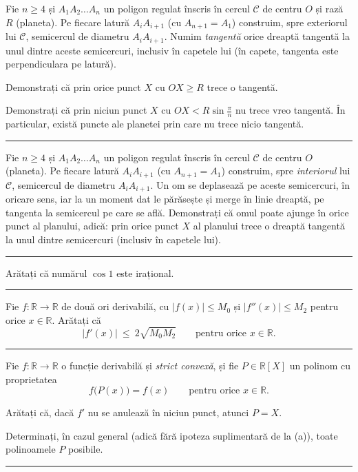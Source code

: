 Fie $n\ge4$ și $A_1A_2\ldots A_n$ un poligon regulat înscris în cercul $\mathcal C$ de centru $O$ și rază $R$ (planeta). Pe fiecare latură $A_iA_{i+1}$ (cu $A_{n+1}=A_1$) construim, spre exteriorul lui $\mathcal C$, semicercul de diametru $A_iA_{i+1}$. Numim \emph{tangentă} orice dreaptă tangentă la unul dintre aceste semicercuri, inclusiv în capetele lui (în capete, tangenta este perpendiculara pe latură).
\begin{parti}
  \item Demonstrați că prin orice punct $X$ cu $OX\ge R$ trece o tangentă.
  \item Demonstrați că prin niciun punct $X$ cu $OX<R\sin\frac{\pi}{n}$ nu trece vreo tangentă. În particular, există puncte ale planetei prin care nu trece nicio tangentă.
\end{parti}
\figpetaleext
\vspace{1mm}\hrule

Fie $n\ge4$ și $A_1A_2\ldots A_n$ un poligon regulat înscris în cercul $\mathcal C$ de centru $O$ (planeta). Pe fiecare latură $A_iA_{i+1}$ (cu $A_{n+1}=A_1$) construim, spre \emph{interiorul} lui $\mathcal C$, semicercul de diametru $A_iA_{i+1}$. Un om se deplasează pe aceste semicercuri, în oricare sens, iar la un moment dat le părăsește și merge în linie dreaptă, pe tangenta la semicercul pe care se află. Demonstrați că omul poate ajunge în orice punct al planului, adică: prin orice punct $X$ al planului trece o dreaptă tangentă la unul dintre semicercuri (inclusiv în capetele lui).
\figpetaleint
\vspace{1mm}\hrule

Arătați că numărul $\cos1$ este irațional.
\vspace{1mm}\hrule

Fie $f:\mathbb{R}\to\mathbb{R}$ de două ori derivabilă, cu $|f(x)|\le M_0$ și $|f''(x)|\le M_2$ pentru orice $x\in\mathbb{R}$. Arătați că
\[ |f'(x)|\ \le\ 2\sqrt{M_0M_2}\qquad\text{pentru orice }x\in\mathbb{R}. \]
\vspace{1mm}\hrule

Fie $f:\mathbb{R}\to\mathbb{R}$ o funcție derivabilă și \emph{strict convexă}, și fie $P\in\mathbb{R}[X]$ un polinom cu proprietatea
\[ f\bigl(P(x)\bigr)=f(x)\qquad\text{pentru orice }x\in\mathbb{R}. \]
\begin{parti}
  \item Arătați că, dacă $f'$ nu se anulează în niciun punct, atunci $P=X$.
  \item Determinați, în cazul general (adică fără ipoteza suplimentară de la (a)), toate polinoamele $P$ posibile.
\end{parti}
\vspace{1mm}\hrule

